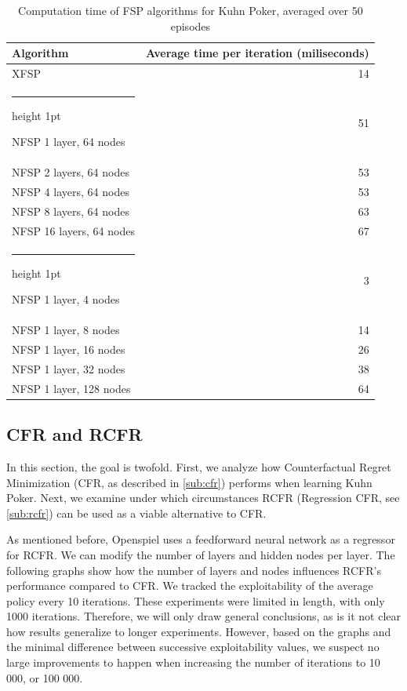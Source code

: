 \documentclass[10pt,a4paper]{article}
\makeatletter
\newcommand{\thickhline}{%
    \noalign {\ifnum 0=`}\fi \hrule height 1pt
    \futurelet \reserved@a \@xhline
}
\makeatother
\begin{document}
\begin{table}[!h]
\begin{center}
\begin{tabular}{|l|r|}
\hline 
Algorithm & Average time per iteration (miliseconds) \\
\hline 
XFSP & 14 \\ 
\thickhline 
NFSP 1 layer, 64 nodes & 51 \\ 
\hline 
NFSP 2 layers, 64 nodes  & 53 \\ 
\hline 
NFSP 4 layers, 64 nodes & 53 \\ 
\hline 
NFSP 8 layers, 64 nodes & 63 \\ 
\hline 
NFSP 16 layers, 64 nodes & 67 \\ 
\thickhline
NFSP 1 layer, 4 nodes & 3 \\ 
\hline 
NFSP 1 layer, 8 nodes & 14 \\ 
\hline 
NFSP 1 layer, 16 nodes & 26 \\ 
\hline 
NFSP 1 layer, 32 nodes & 38 \\ 
\hline 
NFSP 1 layer, 128 nodes & 64 \\ 
\hline 
\end{tabular}
\caption{Computation time of FSP algorithms for Kuhn Poker, averaged over 50 episodes}
\label{tab:time_fsp_kuhn}
\end{center}
\end{table} 
\FloatBarrier
\subsection{CFR and RCFR}

In this section, the goal is twofold. First, we analyze how Counterfactual Regret Minimization (CFR, as described in \ref{sub:cfr}) performs when learning Kuhn Poker. Next, we examine under which circumstances RCFR (Regression CFR, see \ref{sub:rcfr}) can be used as a viable alternative to CFR.

As mentioned before, Openspiel uses a feedforward neural network as a regressor for RCFR. We can modify the number of layers and hidden nodes per layer. The following graphs show how the number of layers and nodes influences RCFR's performance compared to CFR. We tracked the exploitability of the average policy every 10 iterations. These experiments were limited in length, with only 1000 iterations. Therefore, we will only draw general conclusions, as is it not clear how results generalize to longer experiments. However, based on the graphs and the minimal difference between successive exploitability values, we suspect no large improvements to happen when increasing the number of iterations to 10 000, or 100 000.
 
\end{document}
